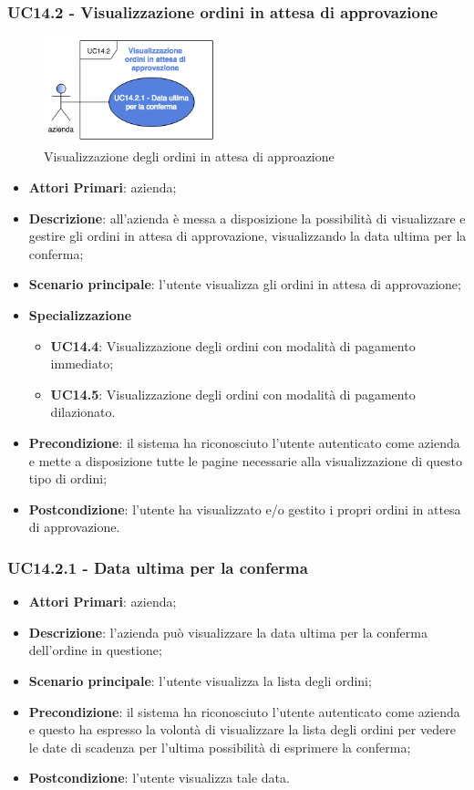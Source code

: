 \subsubsection{UC14.2 - Visualizzazione ordini in attesa di approvazione}
\begin{figure}[H]
	\includegraphics[width=5cm]{res/images/UC14-2.png}
	\centering
	\caption{Visualizzazione degli ordini in attesa di approazione}
\end{figure}
\begin{itemize}
	\item \textbf{Attori Primari}: azienda;
	\item \textbf{Descrizione}: all'azienda è messa a disposizione la possibilità di visualizzare e gestire gli ordini in attesa di approvazione, visualizzando la data ultima per la conferma;
	\item \textbf{Scenario principale}: l'utente visualizza gli ordini in attesa di approvazione;
		\item \textbf{Specializzazione}
	\begin{itemize}
		\item \textbf{UC14.4}: Visualizzazione degli ordini con modalità di pagamento immediato;
		\item \textbf{UC14.5}: Visualizzazione degli ordini con modalità di pagamento dilazionato.
	\end{itemize}
	\item \textbf{Precondizione}: il sistema ha riconosciuto l'utente autenticato come azienda e mette a disposizione tutte le pagine necessarie alla visualizzazione di questo tipo di ordini;
	\item \textbf{Postcondizione}: l'utente ha visualizzato e/o gestito i propri ordini in attesa di approvazione.
\end{itemize} 

\subsubsection{UC14.2.1 - Data ultima per la conferma}
\begin{itemize}
	\item \textbf{Attori Primari}: azienda;
	\item \textbf{Descrizione}: l'azienda può visualizzare la data ultima per la conferma dell'ordine in questione;
	\item \textbf{Scenario principale}: l'utente visualizza la lista degli ordini;
	\item \textbf{Precondizione}: il sistema ha riconosciuto l'utente autenticato come azienda e questo ha espresso la volontà di visualizzare la lista degli ordini per vedere le date di scadenza per l'ultima possibilità di esprimere la conferma;
	\item \textbf{Postcondizione}: l'utente visualizza tale data.
\end{itemize}

